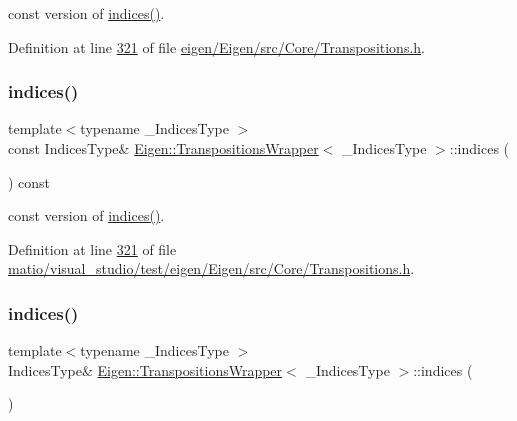 const version of \hyperlink{class_eigen_1_1_transpositions_wrapper_aab0aee4242436a7223fea797a1fa8ee9}{indices()}. 

Definition at line \hyperlink{eigen_2_eigen_2src_2_core_2_transpositions_8h_source_l00321}{321} of file \hyperlink{eigen_2_eigen_2src_2_core_2_transpositions_8h_source}{eigen/\+Eigen/src/\+Core/\+Transpositions.\+h}.

\mbox{\label{class_eigen_1_1_transpositions_wrapper_a5a64081fa7eaa0b02ec10c548505899d}} 
\subsubsection{\texorpdfstring{indices()}{indices()}\hspace{0.1cm}{\footnotesize\ttfamily [2/4]}}
{\footnotesize\ttfamily template$<$typename \+\_\+\+Indices\+Type $>$ \\
const Indices\+Type\& \hyperlink{class_eigen_1_1_transpositions_wrapper}{Eigen\+::\+Transpositions\+Wrapper}$<$ \+\_\+\+Indices\+Type $>$\+::indices (\begin{DoxyParamCaption}{ }\end{DoxyParamCaption}) const\hspace{0.3cm}{\ttfamily [inline]}}

const version of \hyperlink{class_eigen_1_1_transpositions_wrapper_aab0aee4242436a7223fea797a1fa8ee9}{indices()}. 

Definition at line \hyperlink{matio_2visual__studio_2test_2eigen_2_eigen_2src_2_core_2_transpositions_8h_source_l00321}{321} of file \hyperlink{matio_2visual__studio_2test_2eigen_2_eigen_2src_2_core_2_transpositions_8h_source}{matio/visual\+\_\+studio/test/eigen/\+Eigen/src/\+Core/\+Transpositions.\+h}.

\mbox{\label{class_eigen_1_1_transpositions_wrapper_aab0aee4242436a7223fea797a1fa8ee9}} 
\subsubsection{\texorpdfstring{indices()}{indices()}\hspace{0.1cm}{\footnotesize\ttfamily [3/4]}}
{\footnotesize\ttfamily template$<$typename \+\_\+\+Indices\+Type $>$ \\
Indices\+Type\& \hyperlink{class_eigen_1_1_transpositions_wrapper}{Eigen\+::\+Transpositions\+Wrapper}$<$ \+\_\+\+Indices\+Type $>$\+::indices (\begin{DoxyParamCaption}{ }\end{DoxyParamCaption})\hspace{0.3cm}{\ttfamily [inline]}}

